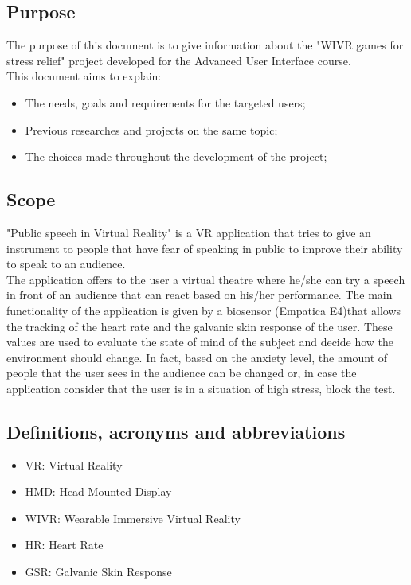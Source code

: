 \subsection{Purpose}
The purpose of this document is to give information about the "WIVR games for stress relief" project developed for the Advanced User Interface course.\\
This document aims to explain:
\begin{itemize}
	\item The needs, goals and requirements for the targeted users;
	\item Previous researches and projects on the same topic;
	\item The choices made throughout the development of the project;
\end{itemize}

\subsection{Scope}
"Public speech in Virtual Reality" is a VR application that tries to give an instrument to people that have fear of speaking in public to improve their ability to speak to an audience.\\
The application offers to the user a virtual theatre where he/she can try a speech in front of an audience that can react based on his/her performance. The main functionality of the application is given by a biosensor (Empatica E4)that allows the tracking of the heart rate and the galvanic skin response of the user. These values are used to evaluate the state of mind of the subject and decide how the environment should change. In fact, based on the anxiety level, the amount of people that the user sees in the audience can be changed or, in case the application consider that the user is in a situation of high stress, block the test.
 
\subsection{Definitions, acronyms and abbreviations}
\begin{itemize}
	\item VR: Virtual Reality
	\item HMD: Head Mounted Display
	\item WIVR: Wearable Immersive Virtual Reality
	\item HR: Heart Rate
	\item GSR: Galvanic Skin Response
\end{itemize}
